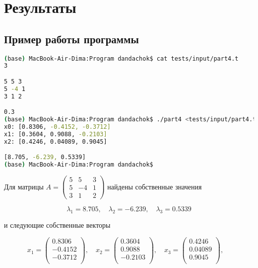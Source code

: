 \section*{Результаты}

\subsection*{Пример работы программы}
\begin{lstlisting}[language=bash]
(base) MacBook-Air-Dima:Program dandachok$ cat tests/input/part4.t
3

5 5 3
5 -4 1
3 1 2

0.3
(base) MacBook-Air-Dima:Program dandachok$ ./part4 <tests/input/part4.t
x0: [0.8306, -0.4152, -0.3712]
x1: [0.3604, 0.9088, -0.2103]
x2: [0.4246, 0.04089, 0.9045]

[8.705, -6.239, 0.5339]
(base) MacBook-Air-Dima:Program dandachok$
\end{lstlisting}

Для матрицы $A=\begin{pmatrix}
    5 & 5 & 3 \\
    5 & -4 & 1 \\
    3 & 1 & 2
\end{pmatrix}$ найдены собственные значения

$$\lambda_1 = 8.705,\quad
\lambda_2 = -6.239,\quad 
\lambda_3 = 0.5339$$

и следующие собственные векторы

$$x_1 = \begin{pmatrix}
    0.8306 \\
    -0.4152 \\
    -0.3712 \\
\end{pmatrix},\quad
x_2 = \begin{pmatrix}
    0.3604 \\
    0.9088 \\
    -0.2103 \\
\end{pmatrix},\quad
x_3 = \begin{pmatrix}
    0.4246 \\
    0.04089 \\
    0.9045 \\
\end{pmatrix},\quad$$

\pagebreak